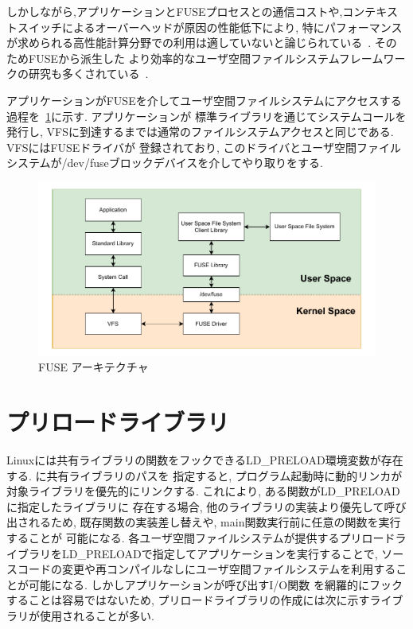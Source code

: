 \documentclass[a4paper,11pt]{jreport}
\begin{document}
しかしながら,アプリケーションとFUSEプロセスとの通信コストや,コンテキストスイッチによるオーバーヘッドが原因の性能低下により, 
特にパフォーマンスが求められる高性能計算分野での利用は適していないと論じられている~\cite{brinkmann2020ad}. そのためFUSEから派生した
より効率的なユーザ空間ファイルシステムフレームワークの研究も多くされている~\cite{294791, zhu2018direct}. 

アプリケーションがFUSEを介してユーザ空間ファイルシステムにアクセスする過程を\figurename~\ref{fig:FUSE}に示す. アプリケーションが
標準ライブラリを通じてシステムコールを発行し, VFSに到達するまでは通常のファイルシステムアクセスと同じである. VFSにはFUSEドライバが
登録されており, このドライバとユーザ空間ファイルシステムが/dev/fuseブロックデバイスを介してやり取りをする.


\newpage


\begin{figure}[h]
	\begin{minipage}[b]{1\columnwidth}
		\centering
		\includegraphics[width=0.9\linewidth]{./figure/FUSE.pdf}
		\caption{FUSE アーキテクチャ}
		\label{fig:FUSE}
	\end{minipage}
\end{figure}

\newpage


\section{プリロードライブラリ}
Linuxには共有ライブラリの関数をフックできるLD\_PRELOAD環境変数が存在する. に共有ライブラリのパスを
指定すると, プログラム起動時に動的リンカが対象ライブラリを優先的にリンクする. これにより, ある関数がLD\_PRELOADに指定したライブラリに
存在する場合, 他のライブラリの実装より優先して呼び出されるため, 既存関数の実装差し替えや, main関数実行前に任意の関数を実行することが
可能になる. 各ユーザ空間ファイルシステムが提供するプリロードライブラリをLD\_PRELOADで指定してアプリケーションを実行することで, 
ソースコードの変更や再コンパイルなしにユーザ空間ファイルシステムを利用することが可能になる. しかしアプリケーションが呼び出すI/O関数
を網羅的にフックすることは容易ではないため, プリロードライブラリの作成には次に示すライブラリが使用されることが多い. 
\end{document}
